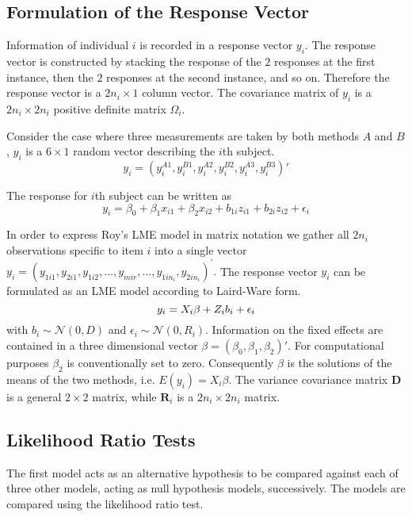 \documentclass[12pt, a4paper]{report}
\theoremstyle{plain}
\theoremstyle{definition}
\theoremstyle{remark}
\begin{document}
	
	\subsection{Formulation of the Response Vector}
	Information of individual $i$ is recorded in a response vector ${y}_{i}$. The response vector is constructed by stacking the response of the $2$ responses at the first instance, then the $2$ responses at the second instance, and so on. Therefore the response vector is a $2n_{i} \times 1$ column vector.
	The covariance matrix of ${y_{i}}$ is a $2n_{i} \times 2n_{i}$ positive definite matrix ${\Omega}_{i}$.
	
	Consider the case where three measurements are taken by both methods $A$ and $B$, ${y}_{i}$ is a $6 \times 1$ random vector describing the $i$th subject.
	\[
	{y}_{i} = (y_{i}^{A1},y_{i}^{B1},y_{i}^{A2},y_{i}^{B2},y_{i}^{A3},y_{i}^{B3}) \prime
	\]
	
	The response for $i$th subject can be written as
	\[ y_i = \beta_0 + \beta_1x_{i1} + \beta_2x_{i2} + b_{1i}z_{i1}  + b_{2i}z_{i2} + \epsilon_i \]
	
	In order to express Roy's LME model in matrix notation we gather all $2n_i$ observations specific to item $i$ into a single vector  ${y}_{i} = (y_{1i1},y_{2i1},y_{1i2},\ldots,y_{mir},\ldots,y_{1in_{i}},y_{2in_{i}})^\prime.$ 
	The response vector ${y_{i}}$ can be formulated as an LME model according to Laird-Ware form.
	\begin{equation}
		{y_{i}} = {X_{i}\beta}  + {Z_{i}b_{i}} + {\epsilon_{i}}\\
\label{ARoy2009-model2}
	\end{equation}
with ${b_{i}} \sim \mathcal{N}({0,D})$ and ${\epsilon_{i}} \sim \mathcal{N}({0,R_{i}})$. Information on the fixed effects are contained in a three dimensional vector ${\beta} = (\beta_{0},\beta_{1},\beta_{2})\prime$. For computational purposes $\beta_{2}$ is conventionally set to zero. Consequently ${\beta}$ is the solutions of the means of the two methods, i.e. $E({y}_{i})  = {X}_{i}{\beta}$. The variance covariance matrix $\boldsymbol{D}$ is a general $2 \times 2$ matrix, while $\boldsymbol{R}_{i}$ is a $2n_{i} \times 2n_{i}$ matrix.
	
	
	\subsection{Likelihood Ratio Tests}
	The first model acts as an alternative hypothesis to be compared against each of three other models, acting as null hypothesis models, successively. The models are compared using the likelihood ratio test. 
	
\end{document}
